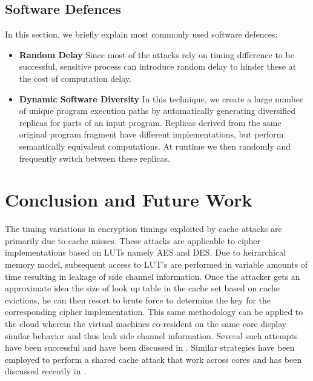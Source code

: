 \documentclass[twocolumn]{IEEEtran}
\begin{document}
\subsection {Software Defences}
In this section, we briefly explain most commonly used software defences:
\begin{itemize}
\item \textbf{Random Delay} Since most of the attacks rely on timing difference to be successful, sensitive process can introduce random delay to hinder these at the cost of computation delay.
\item \textbf{Dynamic Software Diversity}\cite{crane2015thwarting} In this technique, we create a large number of unique program execution paths by automatically generating diversified replicas for parts of an input program. Replicas derived from the same original program  fragment have different implementations, but perform semantically equivalent computations. At runtime we then randomly and frequently switch between these replicas.
\end{itemize}

\section {Conclusion and Future Work}

The timing variations in encryption timings exploited by cache attacks are primarily due to cache misses. These attacks are applicable to cipher implementations based on LUTs namely AES and DES. Due to heirarchical memory model, subsequent access to LUT's are performed in variable amounts of time resulting in leakage of side channel information. Once the attacker gets an approximate idea the size of look up table in the cache set based on cache evictions, he can then resort to brute force to determine the key for the corresponding cipher implementation. This same methodology can be applied to the cloud wherein the virtual machines co-resident on the same core display similar behavior and thus leak side channel information. Several such attempts have been successful and have been discussed in  \cite{sc2015lastlevel}.  Similar strategies have been employed to perform a shared cache attack that work across cores and has been discussed recently in \cite{ir2015aes}.






\end{document}
